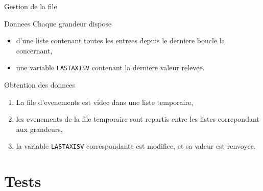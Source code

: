 \documentclass[footheight=2em]{beamer}
\begin{document}
\begin{frame}[t]{Gestion de la file}
  \begin{block}{Donnees}
    Chaque grandeur dispose
    \begin{itemize}
      \item d'une liste contenant toutes les entrees depuis le derniere boucle
        la concernant,
      \item une variable \texttt{LASTAXISV} contenant la derniere
        valeur relevee.
    \end{itemize}
  \end{block}
  \begin{block}{Obtention des donnees}
    \begin{enumerate}
      \item La file d'evenements est videe dans une liste temporaire,
      \item les evenements de la file temporaire sont repartis entre les listes
        correpondant aux grandeurs,
      \item la variable \texttt{LASTAXISV} correspondante est modifiee, et sa
        valeur est renvoyee.
    \end{enumerate}
  \end{block}
\end{frame}

\section{Tests}
\end{document}
